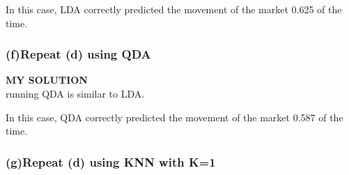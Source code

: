\documentclass[
]{article}
\newenvironment{Shaded}{\begin{snugshade}}{\end{snugshade}}
\newcommand{\AttributeTok}[1]{\textcolor[rgb]{0.77,0.63,0.00}{#1}}
\newcommand{\CommentTok}[1]{\textcolor[rgb]{0.56,0.35,0.01}{\textit{#1}}}
\newcommand{\DecValTok}[1]{\textcolor[rgb]{0.00,0.00,0.81}{#1}}
\newcommand{\ErrorTok}[1]{\textcolor[rgb]{0.64,0.00,0.00}{\textbf{#1}}}
\newcommand{\FloatTok}[1]{\textcolor[rgb]{0.00,0.00,0.81}{#1}}
\newcommand{\FunctionTok}[1]{\textcolor[rgb]{0.00,0.00,0.00}{#1}}
\newcommand{\NormalTok}[1]{#1}
\newcommand{\OtherTok}[1]{\textcolor[rgb]{0.56,0.35,0.01}{#1}}
\newcommand{\SpecialCharTok}[1]{\textcolor[rgb]{0.00,0.00,0.00}{#1}}
\begin{document}
In this case, LDA correctly predicted the movement of the market 0.625
of the time.

\hypertarget{frepeat-d-using-qda}{%
\subsubsection{\texorpdfstring{\textbf{(f)Repeat (d) using
QDA}}{(f)Repeat (d) using QDA}}\label{frepeat-d-using-qda}}

\textbf{MY SOLUTION}\\
running QDA is similar to LDA.

\begin{Shaded}
\end{Shaded}

In this case, QDA correctly predicted the movement of the market 0.587
of the time.

\hypertarget{grepeat-d-using-knn-with-k1}{%
\subsubsection{\texorpdfstring{\textbf{(g)Repeat (d) using KNN with
K=1}}{(g)Repeat (d) using KNN with K=1}}\label{grepeat-d-using-knn-with-k1}}
\end{document}
